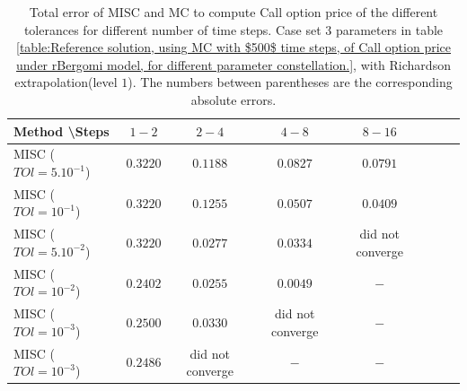 \documentclass[11pt]{article}
\begin{document}
\begin{table}[h!]
\centering
\begin{tabular}{l*{6}{c}r}
Method \textbackslash  Steps            & $1-2$ & $2-4$ & $4-8$ & $8-16$  \\
\hline
MISC ($TOl=5.10^{-1}$)  & $\mathbf{0.3220}$ & $\mathbf{0.1188}$ & $\mathbf{0.0827}$ & $\mathbf{0.0791}$ \\
MISC ($TOl=10^{-1}$)  & $\mathbf{0.3220}$  & $\mathbf{0.1255}$ & $\mathbf{0.0507}$ & $\mathbf{0.0409}$  \\
MISC ($TOl=5.10^{-2}$)  & $\mathbf{0.3220}$  & $\mathbf{0.0277}$ & $\mathbf{0.0334}$ & did not converge  \\

MISC ($TOl=10^{-2}$)  & $\mathbf{0.2402}$ & $\mathbf{0.0255}$ & $\mathbf{0.0049}$ & $\mathbf{-}$  \\	

MISC ($TOl=10^{-3}$)  &$\mathbf{0.2500}$  & $\mathbf{0.0330}$  & did not converge & $\mathbf{-}$ \\	

MISC ($TOl=10^{-3}$)  &$\mathbf{0.2486}$  & did not converge & $\mathbf{-}$  & $\mathbf{-}$ \\	

\hline

%		

\end{tabular}
\caption{Total  error of MISC and MC to compute Call option price of the different tolerances for different number of time steps. Case set $3$ parameters in table \ref{table:Reference solution, using MC with $500$ time steps, of Call option price under rBergomi model, for different parameter constellation.}, with Richardson extrapolation(level $1$). The numbers between parentheses are the corresponding absolute errors.}
\label{Total  error of MISC and MC to compute Call option price of the different tolerances for different number of time steps. Case set $3$ parameters, with Richardson extrapolation(level $1$). The numbers between parentheses are the corresponding absolute errors.}
\end{table}
\end{document}
